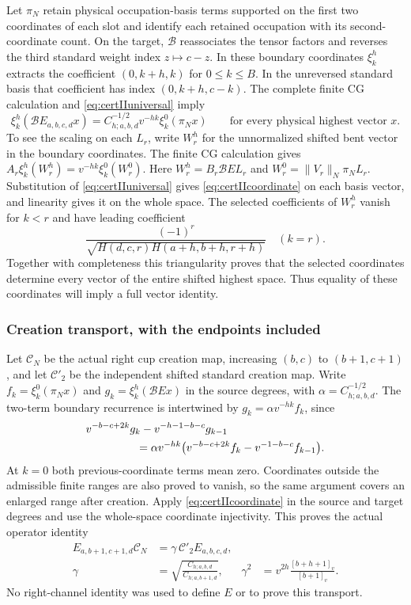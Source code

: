 \documentclass[10pt,a4paper]{article}
\newenvironment{revision}{\begingroup}{\endgroup}
\begin{document}
\begin{revision}
Let $\pi_N$ retain physical occupation-basis terms supported on the first
two coordinates of each slot and identify each retained occupation with
its second-coordinate count. On the target, $\mathcal B$ reassociates the
tensor factors and reverses the third standard weight index $z\mapsto c-z$.
In these boundary coordinates $\xi_k^h$ extracts the coefficient
$(0,k+h,k)$ for $0\le k\le B$. In the unreversed standard basis that
coefficient has index $(0,k+h,c-k)$.
The complete finite CG calculation and \eqref{eq:certIIuniversal} imply
\begin{equation}\label{eq:certIIcoordinate}
 \xi_k^h(\mathcal B E_{a,b,c,d}x)
   =C_{h;a,b,d}^{-1/2}v^{-hk}\xi_k^0(\pi_Nx)
 \qquad\text{for every physical highest vector }x.
\end{equation}
To see the scaling on each $L_r$, write $W_r^h$ for the unnormalized
shifted bent vector in the boundary coordinates. The finite CG calculation
gives $A_r\xi_k^h(W_r^h)=v^{-hk}\xi_k^0(W_r^0)$.
Here $W_r^h=B_r\mathcal B E L_r$ and
$W_r^0=\|V_r\|_N\pi_N L_r$. Substitution of
\eqref{eq:certIIuniversal} gives \eqref{eq:certIIcoordinate} on each basis
vector, and linearity gives it on the whole space. The selected
coefficients of $W_r^h$ vanish for $k<r$ and have leading coefficient
\[
 \frac{(-1)^r}{\sqrt{H(d,c,r)H(a+h,b+h,r+h)}}\quad(k=r).
\]
Together with completeness this triangularity proves that the selected
coordinates determine every vector of the entire shifted highest space.
Thus equality of these coordinates will imply a full vector identity.

\subsubsection*{Creation transport, with the endpoints included}
Let $\mathcal C_N$ be the actual right cup creation map, increasing
$(b,c)$ to $(b+1,c+1)$, and let $\mathcal C'_2$ be the independent
shifted standard creation map. Write $f_k=\xi_k^0(\pi_Nx)$ and $g_k=\xi_k^h(\mathcal B Ex)$ in the
source degrees, with $\alpha=C_{h;a,b,d}^{-1/2}$. The two-term boundary
recurrence is intertwined by $g_k=\alpha v^{-hk}f_k$, since
\begin{align}
 &v^{-b-c+2k}g_k-v^{-h-1-b-c}g_{k-1}\notag\\
 &\hspace{16mm}=\alpha v^{-hk}
       \bigl(v^{-b-c+2k}f_k-v^{-1-b-c}f_{k-1}\bigr).
 \label{eq:certIIdifference}
\end{align}
At $k=0$ both previous-coordinate terms mean zero. Coordinates outside
the admissible finite ranges are also proved to vanish, so the same
argument covers an enlarged range after creation. Apply
\eqref{eq:certIIcoordinate} in the source and target degrees and use
the whole-space coordinate injectivity. This proves the actual operator
identity
\begin{align}
 E_{a,b+1,c+1,d}\mathcal C_N
   &=\gamma\,\mathcal C'_2E_{a,b,c,d},\label{eq:certIIcreation}\\
 \gamma&=\sqrt{\frac{C_{h;a,b,d}}{C_{h;a,b+1,d}}},
 &\gamma^2&=v^{2h}\frac{[b+h+1]_v}{[b+1]_v}.
 \label{eq:certIIgamma}
\end{align}
No right-channel identity was used to define $E$ or to prove this transport.


\end{revision}
\end{document}

